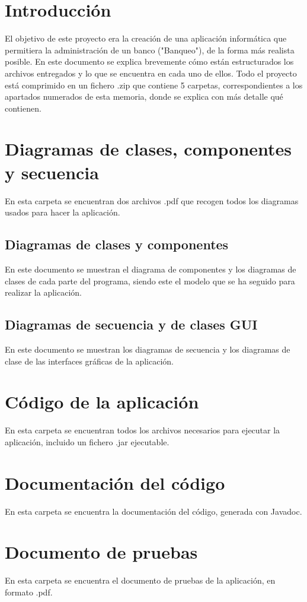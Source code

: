 \tableofcontents
\newpage
\section*{Introducción}
El objetivo de este proyecto era la creación de una aplicación informática que permitiera la administración de un banco ("Banqueo"), de la forma más realista posible. 
En este documento se explica brevemente cómo están estructurados los archivos entregados y lo que se encuentra en cada uno de ellos. Todo el proyecto está comprimido en un fichero .zip que contiene 5 carpetas, correspondientes a los apartados numerados de esta memoria, donde se explica con más detalle qué contienen.

\section{Diagramas de clases, componentes y secuencia}
En esta carpeta se encuentran dos archivos .pdf que recogen todos los diagramas usados para hacer la aplicación.
\subsection{Diagramas de clases y componentes}
En este documento se muestran el diagrama de componentes y los diagramas de clases de cada parte del programa, siendo este el modelo que se ha seguido para realizar la aplicación.
\subsection{Diagramas de secuencia y de clases GUI}
En este documento se muestran los diagramas de secuencia y los diagramas de clase de las interfaces gráficas de la aplicación.

\section{Código de la aplicación}
En esta carpeta se encuentran todos los archivos necesarios para ejecutar la aplicación, incluido un fichero .jar ejecutable.

\section{Documentación del código}
En esta carpeta se encuentra la documentación del código, generada con Javadoc.

\section{Documento de pruebas}
En esta carpeta se encuentra el documento de pruebas de la aplicación, en formato .pdf.

